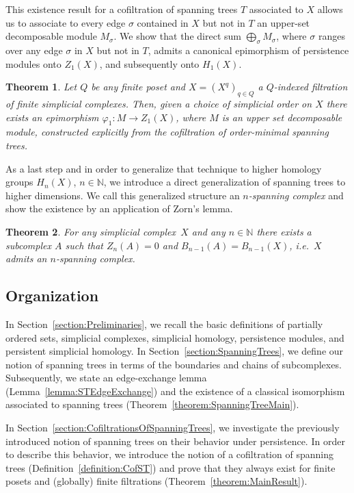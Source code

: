 \documentclass[oneside]{amsart}
\newtheorem{theorem}{Theorem}
\theoremstyle{definition}
\begin{document}
This existence result for a cofiltration of spanning trees $T$ associated to $X$ allows us to associate to every edge $\sigma$ contained in $X$ but not in $T$ an upper-set decomposable module $M_\sigma$.
We show that the direct sum $\bigoplus_\sigma M_\sigma$, where $\sigma$ ranges over any edge $\sigma$ in $X$ but not in $T$, admits a canonical epimorphism of persistence modules onto $Z_1(X)$, and subsequently onto $H_1(X)$.
\begin{theorem}
    Let $Q$ be any finite poset and $X = (X^q)_{q \in Q}$ a $Q$-indexed filtration of finite simplicial complexes.
    Then, given a choice of simplicial order on $X$ there exists an epimorphism $\varphi_1\colon M \to Z_1(X)$, where $M$ is an upper set decomposable module, constructed explicitly from the cofiltration of order-minimal spanning trees.
\end{theorem}

As a last step and in order to generalize that technique to higher homology groups $H_n(X)$, $n \in \mathbb N$, we introduce a direct generalization of spanning trees to higher dimensions.
We call this generalized structure an \emph{$n$-spanning complex} and show the existence by an application of Zorn's lemma.

\begin{theorem}
    For any simplicial complex~$X$ and any $n \in \mathbb N$ there exists a subcomplex $A$ such that $Z_n(A) = 0$ and $B_{n-1}(A) = B_{n-1}(X)$, i.e.\ $X$ admits an $n$-spanning complex.
\end{theorem}

\subsection{Organization}
In Section~\ref{section:Preliminaries}, we recall the basic definitions of partially ordered sets, simplicial complexes, simplicial homology, persistence modules, and persistent simplicial homology.
In Section~\ref{section:SpanningTrees}, we define our notion of spanning trees in terms of the boundaries and chains of subcomplexes.
Subsequently, we state an edge-exchange lemma (Lemma~\ref{lemma:STEdgeExchange}) and the existence of a classical isomorphism associated to spanning trees (Theorem~\ref{theorem:SpanningTreeMain}).

In Section~\ref{section:CofiltrationsOfSpanningTrees}, we investigate the previously introduced notion of spanning trees on their behavior under persistence.
In order to describe this behavior, we introduce the notion of a cofiltration of spanning trees (Definition~\ref{definition:CofST}) and prove that they always exist for finite posets and (globally) finite filtrations (Theorem~\ref{theorem:MainResult}).
\end{document}
